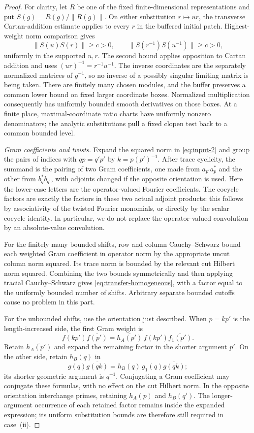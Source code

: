 \begin{proof}
For clarity, let $R$ be one of the fixed finite-dimensional
representations and put $S(g)=R(g)/\|R(g)\|$. On either substitution $r\mapsto ur$, the
transverse Cartan-addition estimate applies to every $r$ in the
buffered initial patch. Highest-weight norm comparison gives
\[
 \|S(u)S(r)\|\geq c>0,\qquad
 \|S(r^{-1})S(u^{-1})\|\geq c>0,
\]
uniformly in the supported $u,r$. The second bound applies
opposition to Cartan addition and uses $(ur)^{-1}=r^{-1}u^{-1}$.
The inverse coordinates are the separately normalized matrices of
$g^{-1}$, so no inverse of a possibly singular limiting matrix is
being taken. There are finitely many chosen modules, and the buffer
preserves a common lower bound on fixed larger coordinate boxes.
Normalized multiplication consequently has uniformly bounded
smooth derivatives on those boxes. At a finite place, maximal-coordinate
ratio charts have uniformly nonzero denominators; the analytic
substitutions pull a fixed clopen test back to a common bounded level.

\emph{Gram coefficients and twists.}
Expand the squared norm in \eqref{eq:input-2} and group the pairs of
indices with $qp=q'p'$ by $k=p(p')^{-1}$. After trace cyclicity, the
summand is the pairing of two Gram coefficients, one made from
$a_{p'}a_p^*$ and the other from $b_q^*b_{q'}$, with adjoints changed
if the opposite orientation is used. Here the lower-case letters are
the operator-valued Fourier coefficients. The cocycle factors are
exactly the factors in these two actual adjoint products: this follows
by associativity of the twisted Fourier monomials, or directly by the
scalar cocycle identity. In particular, we do not replace the
operator-valued convolution by an absolute-value convolution.

For the finitely many bounded shifts, row and column
Cauchy--Schwarz bound each weighted Gram coefficient in operator norm
by the appropriate uncut column norm squared. Its trace norm is
bounded by the relevant cut Hilbert norm squared. Combining the two
bounds symmetrically and then applying tracial Cauchy--Schwarz gives
\eqref{eq:transfer-homogeneous}, with a factor equal to the uniformly
bounded number of shifts. Arbitrary separate bounded cutoffs cause
no problem in this part.

For the unbounded shifts, use the orientation just described.
When $p=kp'$ is the length-increased side, the first Gram weight is
\[
 f(kp')\overline{f(p')}
 =\overline{h_A(p')}\,
       f(kp')\overline{f_1(p')}.
\]
Retain $\overline{h_A(p')}$ and expand the remaining factor in
the shorter argument $p'$. On the other side, retain $h_B(q)$ in
\[
 g(q)\overline{g(qk)}
 =h_B(q)\,g_1(q)\overline{g(qk)};
\]
its shorter geometric argument is $q^{-1}$. Conjugating a Gram
coefficient may conjugate these formulas, with no effect on the cut
Hilbert norm. In the opposite orientation interchange primes, retaining
$h_A(p)$ and $h_B(q')$. The longer-argument occurrence of each retained
factor remains inside the expanded expression; its uniform substitution
bounds are therefore still required in case~\textup{(ii)}.


\end{proof}
